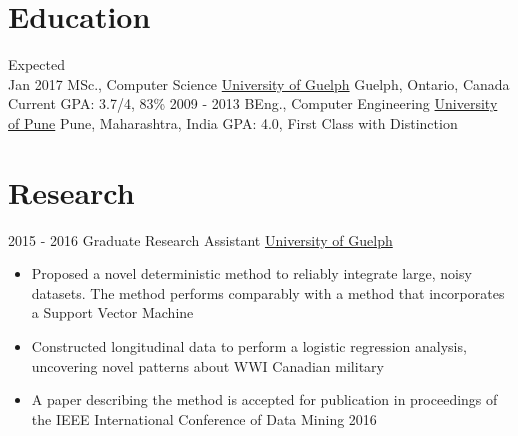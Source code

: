 \documentclass[letterpaper]{twentysecondcv} %
\begin{document}
\makeprofile %

\section{Education}

\begin{twenty} %
	\twentyitem
    	{Expected \\ Jan 2017}
        {MSc., Computer Science}
        {\href{http://www.uoguelph.ca/}{University of Guelph}}
        {Guelph, Ontario, Canada}
        {Current GPA: 3.7/4, 83\%}
	\twentyitem
    	{2009 - 2013}
        {BEng., Computer Engineering}
        {\href{http://www.unipune.ac.in/}{University of Pune}}
        {Pune, Maharashtra, India}
        {GPA: 4.0, First Class with Distinction}
\end{twenty}


\section{Research}
\begin{twenty}
	\twentyitem
    	{2015 - 2016}
        {Graduate Research Assistant}
        {\href{http://www.uoguelph.ca/}{University of Guelph}}
        {}
        {
        {\begin{itemize}
        \item Proposed a novel deterministic method to reliably integrate large, noisy datasets. The method performs comparably with a method that incorporates a Support Vector Machine
        \item Constructed longitudinal data to perform a logistic regression analysis, uncovering novel patterns about WWI Canadian military
        \item A paper describing the method is accepted for publication in proceedings of the IEEE International Conference of Data Mining 2016
    \end{itemize}}
        }
\end{twenty}

\end{document}
